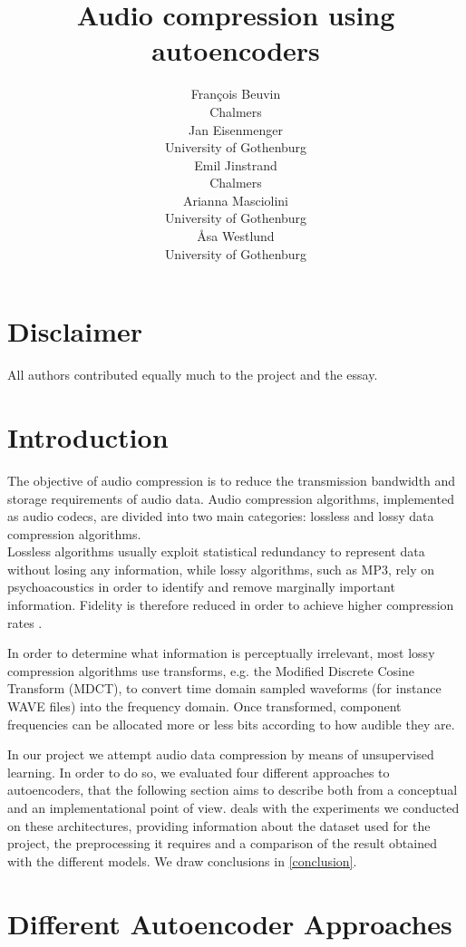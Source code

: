 \documentclass[11pt]{article}
\title{Audio compression using autoencoders}
\author{Fran\c{c}ois Beuvin \\
  Chalmers \\
  \And
  Jan Eisenmenger \\
  University of Gothenburg \\
  \And
  Emil Jinstrand \\
  Chalmers \\
  \AND
  Arianna Masciolini \\
  University of Gothenburg\\
  \And
  \r{A}sa Westlund \\
  University of Gothenburg\\}
\date{}
\begin{document}
\maketitle

\section*{Disclaimer}
All authors contributed equally much to the project and the essay. \\

\begin{abstract}
\end{abstract}

\section{Introduction}
The objective of audio compression is to reduce the transmission bandwidth and storage requirements of audio data. Audio compression algorithms, implemented as audio codecs, are divided into two main categories: lossless and lossy data compression algorithms.\\ 
Lossless algorithms usually exploit statistical redundancy to represent data without losing any information, while lossy algorithms, such as MP3, rely on psychoacoustics in order to identify and remove marginally important information. Fidelity is therefore reduced in order to achieve higher compression rates \cite{Mahdi.2012}.\par
In order to determine what information is perceptually irrelevant, most lossy compression algorithms use transforms, e.g. the Modified Discrete Cosine Transform (MDCT), to convert time domain sampled waveforms (for instance WAVE files) into the frequency domain. Once transformed, component frequencies can be allocated more or less bits according to how audible they are. \par
In our project we attempt audio data compression by means of unsupervised learning. In order to do so, we evaluated four different approaches to autoencoders, that the following section aims to describe both from a conceptual and an implementational point of view.  deals with the experiments we conducted on these architectures, providing information about the dataset used for the project, the preprocessing it requires and a comparison of the result obtained with the different models. We draw conclusions in \autoref{conclusion}.

\section{Different Autoencoder Approaches} \label{architectures}
   
\end{document}
